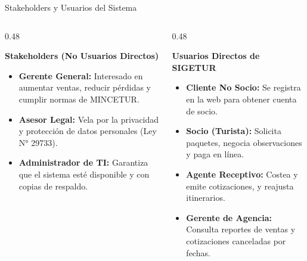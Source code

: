 \documentclass[aspectratio=169, 10pt]{beamer}
\begin{document}
\begin{frame}{Stakeholders y Usuarios del Sistema}
    \begin{columns}[t]
        \begin{column}{0.48\textwidth}
            \begin{block}{\textbf{Stakeholders (No Usuarios Directos)}}
                \small
                \begin{itemize}
                    \item \textbf{Gerente General:} Interesado en aumentar ventas, reducir pérdidas y cumplir normas de MINCETUR.
                    \item \textbf{Asesor Legal:} Vela por la privacidad y protección de datos personales (Ley N° 29733).
                    \item \textbf{Administrador de TI:} Garantiza que el sistema esté disponible y con copias de respaldo.
                \end{itemize}
            \end{block}
        \end{column}

        \begin{column}{0.48\textwidth}
            \begin{block}{\textbf{Usuarios Directos de SIGETUR}}
                \small
                \begin{itemize}
                    \item \textbf{Cliente No Socio:} Se registra en la web para obtener cuenta de socio.
                    \item \textbf{Socio (Turista):} Solicita paquetes, negocia observaciones y paga en línea.
                    \item \textbf{Agente Receptivo:} Costea y emite cotizaciones, y reajusta itinerarios.
                    \item \textbf{Gerente de Agencia:} Consulta reportes de ventas y cotizaciones canceladas por fechas.
                \end{itemize}
            \end{block}
        \end{column}
    \end{columns}
\end{frame}
\end{document}

